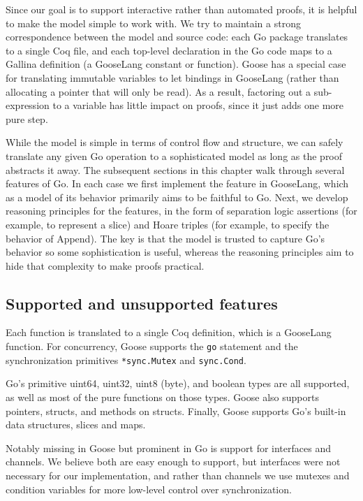 Since our goal is to support interactive rather than automated proofs,
it is helpful to make the model simple to work with. We try to maintain
a strong correspondence between the model and source code: each Go
package translates to a single Coq file, and each top-level declaration
in the Go code maps to a Gallina definition (a GooseLang constant or
function). Goose has a special case for translating immutable variables
to let bindings in GooseLang (rather than allocating a pointer that will
only be read). As a result, factoring out a sub-expression to a variable
has little impact on proofs, since it just adds one more pure step.

While the model is simple in terms of control flow and structure, we can
safely translate any given Go operation to a sophisticated model as long
as the proof abstracts it away. The subsequent sections in this chapter
walk through several features of Go. In each case we first implement the
feature in GooseLang, which as a model of its behavior primarily aims to
be faithful to Go. Next, we develop reasoning principles for the
features, in the form of separation logic assertions (for example, to
represent a slice) and Hoare triples (for example, to specify the
behavior of Append). The key is that the model is trusted to capture
Go's behavior so some sophistication is useful, whereas the reasoning
principles aim to hide that complexity to make proofs practical.

\hypertarget{supported-and-unsupported-features}{%
\subsection{Supported and unsupported
features}\label{supported-and-unsupported-features}}

Each function is translated to a single Coq definition, which is a
GooseLang function. For concurrency, Goose supports the \texttt{go}
statement and the synchronization primitives \texttt{*sync.Mutex} and
\texttt{sync.Cond}.

Go's primitive uint64, uint32, uint8 (byte), and boolean types are all
supported, as well as most of the pure functions on those types. Goose
also supports pointers, structs, and methods on structs. Finally, Goose
supports Go's built-in data structures, slices and maps.

Notably missing in Goose but prominent in Go is support for interfaces
and channels. We believe both are easy enough to support, but interfaces
were not necessary for our implementation, and rather than channels we
use mutexes and condition variables for more low-level control over
synchronization.

